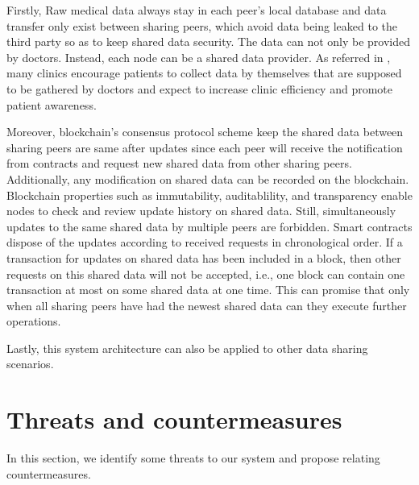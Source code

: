 \documentclass[conference]{IEEEtran}
\begin{document}


Firstly, Raw medical data always stay in each peer's local database and data transfer only exist between sharing peers, which avoid data being leaked to the third party so as to keep shared data security. The data can not only be provided by doctors. Instead, each node can be a shared data provider. As referred in \cite{chung2018using},  many clinics encourage patients to collect data by themselves that are supposed to be gathered by doctors and expect to increase clinic efficiency and promote patient awareness. 

Moreover, blockchain's consensus protocol scheme keep the shared data between sharing peers are same after updates since each peer will receive the notification from contracts and request new shared data from other sharing peers. Additionally, any modification on shared data can be recorded on the blockchain. Blockchain properties such as immutability, auditablility, and transparency enable nodes to check and review update history on shared data. Still, simultaneously updates to the same shared data by multiple peers are forbidden. Smart contracts dispose of the updates according to received requests in chronological order. If a transaction for updates on shared data has been included in a block, then other requests on this shared data will not be accepted, i.e., one block can contain one transaction at most on some shared data at one time. This can promise that only when all sharing peers have had the newest shared data can they execute further operations.

Lastly, this system architecture can also be applied to other data sharing scenarios.


\section{Threats and countermeasures}
\label{threats}
 In this section, we identify some threats to our system and propose relating countermeasures.
\end{document}
